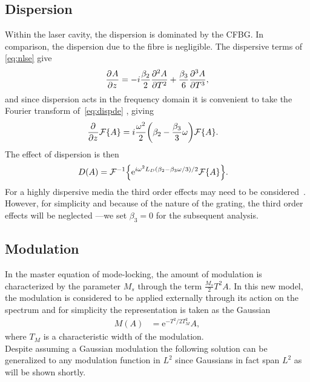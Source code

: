 \subsection{Dispersion}
Within the laser cavity, the dispersion is dominated by the CFBG. In comparison, the dispersion due to the fibre is negligible. The dispersive terms of \eqref{eq:nlse} give
\begin{align}
\label{eq:dispde}
	\pdiff{A}{z} = -i \frac{\beta_2}{2} \pdiff[2]{A}{T} + \frac{\beta_3}{6} \pdiff[3]{A}{T},
\end{align}
and since dispersion acts in the frequency domain it is convenient to take the Fourier transform of~\eqref{eq:dispde} \cite{debnath, gradshteyn}, giving
\begin{align*}
	\pdiff{}{z}\FT{A} &= i\frac{\omega^2}{2}\left(\beta_2 - \frac{\beta_3}{3} \omega\right) \FT{A}.
\end{align*}
The effect of dispersion is then
\begin{align*}
D(A) &= \FTi{\textrm{e}^{i \omega^2 L_D(\beta_2 - \beta_3 \omega/3)/2} \FT{A}}.
\end{align*}
For a highly dispersive media the third order effects may need to be considered~\cite{agrawal2013, litchinitser}. However, for simplicity and because of the nature of the grating, the third order effects will be neglected \cite{agrawal2013, ferreira}---we set $\beta_3=0$ for the subsequent analysis. \\

\subsection{Modulation}
In the master equation of mode-locking, the amount of modulation is characterized by the parameter $M_s$ through the term $\frac{M_s}{2}T^2 A$. In this new model, the modulation is considered to be applied externally through its action on the spectrum and for simplicity the representation is taken as the Gaussian
\begin{align*}
M(A) &= \textrm{e}^{-T^2 / 2 T_M^2} A,
\end{align*}
where $T_M$ is a characteristic width of the modulation. \\

Despite assuming a Gaussian modulation the following solution can be generalized to any modulation function in $L^2$ since Gaussians in fact span $L^2$ as will be shown shortly. \\



